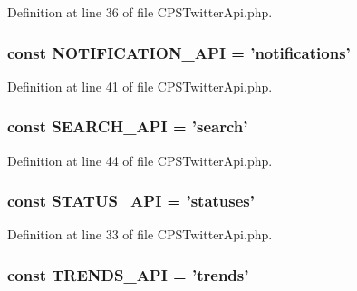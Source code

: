 Definition at line 36 of file CPSTwitterApi.php.

\hypertarget{classCPSTwitterApi_a22f1a8ed1263d6338c4e3a310e4f41d2}{
\subsubsection[{NOTIFICATION\_\-API}]{\setlength{\rightskip}{0pt plus 5cm}const {\bf NOTIFICATION\_\-API} = 'notifications'}}
\label{classCPSTwitterApi_a22f1a8ed1263d6338c4e3a310e4f41d2}


Definition at line 41 of file CPSTwitterApi.php.

\hypertarget{classCPSTwitterApi_a9e8d909f187a5d06bebda16dd0dc3dea}{
\subsubsection[{SEARCH\_\-API}]{\setlength{\rightskip}{0pt plus 5cm}const {\bf SEARCH\_\-API} = 'search'}}
\label{classCPSTwitterApi_a9e8d909f187a5d06bebda16dd0dc3dea}


Definition at line 44 of file CPSTwitterApi.php.

\hypertarget{classCPSTwitterApi_a19f41a351a36bfa05c541b86e9f84a46}{
\subsubsection[{STATUS\_\-API}]{\setlength{\rightskip}{0pt plus 5cm}const {\bf STATUS\_\-API} = 'statuses'}}
\label{classCPSTwitterApi_a19f41a351a36bfa05c541b86e9f84a46}


Definition at line 33 of file CPSTwitterApi.php.

\hypertarget{classCPSTwitterApi_ad257a5f5d08047d89a236c8cbec1a449}{
\subsubsection[{TRENDS\_\-API}]{\setlength{\rightskip}{0pt plus 5cm}const {\bf TRENDS\_\-API} = 'trends'}}
\label{classCPSTwitterApi_ad257a5f5d08047d89a236c8cbec1a449}


